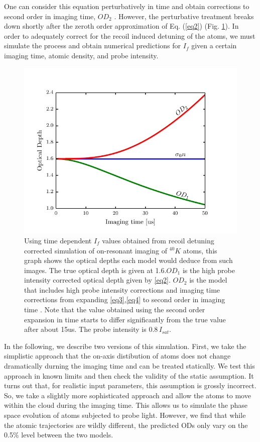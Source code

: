 \documentclass[12pt]{iopart}
\begin{document}
\par One can consider this equation perturbatively in time and obtain corrections to second order in imaging time, $OD_2$  \cite{LJLthesis}. However, the perturbative treatment breaks down shortly after the zeroth order approximation of Eq. (\ref{eq2}) (Fig. \ref{fig:ODcorrections}). In order to adequately correct for the recoil induced detuning of the atoms, we must simulate the process and obtain numerical predictions for $I_f$ given a certain imaging time, atomic density, and probe intensity. 
\begin{figure}
	\includegraphics*{figure2.pdf}
\caption{Using time dependent $I_f$ values obtained from recoil detuning corrected simulation of on-resonant imaging of $^{40}K$ atoms, this graph shows the optical depths each model would deduce from such images. The true optical depth is given at 1.6.$OD_1$ is the high probe intensity corrected optical depth given by \ref{eq2}. $OD_2$ is the model that includes high probe intensity corrections and imaging time corrections from expanding \ref{eq3},\ref{eq4} to second order in imaging time \cite{LJLthesis}. Note that the value obtained using the second order expansion in time starts to differ significantly from the true value after about 15us. The probe intensity is $0.8\, I_{sat}$. }  
\label{fig:ODcorrections}
\end{figure}
\par In the following, we describe two versions of this simulation. First, we take the simplistic approach that the on-axis distibution of atoms does not change dramatically durning the imaging time and can be treated statically. We test this approach in known limits and then check the validity of the static assumption. It turns out that, for realistic input parameters, this assumption is grossly incorrect. So, we take a slightly more sophisticated approach and allow the atoms to move within the cloud during the imaging time. This allows us to simulate the phase space evolution of atoms subjected to probe light. However,   
 we find that  while the atomic trajectories are wildly different, the predicted ODs only vary on the 0.5$\%$ level between the two models. 
\end{document}
